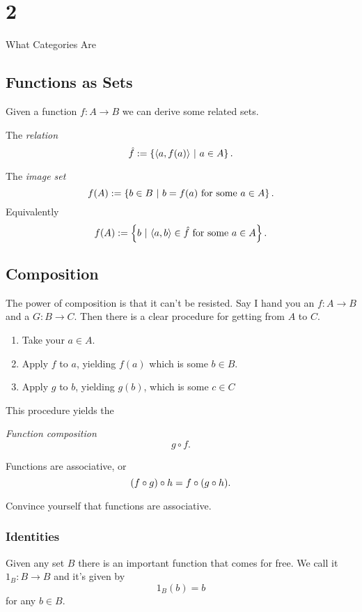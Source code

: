 \documentclass[12pt]{article}
\begin{document}
\chapter{2}{What Categories Are}

\section{Functions as Sets}
    Given a function $f: A \to B$ we can derive some related sets.
    \begin{defi}
        The \emph{relation}
        $$\hat{f} := \left\{ \langle a, f(a) \rangle \ | \  a \in A\right\}.$$ 
    \end{defi}
    \begin{defi}
        The \emph{image set} 
        $$f(A) := \left\{b \in B \ | \   b = f(a) \text{ for some } a \in A\right\}.$$ 
        Equivalently
        $$f(A) := \left\{b \ | \  \langle a, b \rangle \in \hat{f} \text { for some } a \in A\right\}.$$
    \end{defi}

\section{Composition}

    The power of composition is that it can't be resisted.
    Say I hand you an $f : A \to B$ and a $G : B \to C$. 
    Then there is a clear procedure for getting from $A$ to $C$.
    \begin{enumerate}[(1)]
        \item Take your $a \in A$.
        \item Apply $f$ to $a$, yielding $f(a)$ which is some $b \in B$.
        \item Apply $g$ to $b$, yielding $g(b)$, which is some $c \in C$
    \end{enumerate}
    This procedure yields the
    \begin{defi}
        \emph{Function composition}
        $$g\circ f.$$
    \end{defi}

    \begin{fact}
        Functions are associative, or
        $$(f \circ g) \circ h = f \circ (g \circ h).$$
    \end{fact}
    \begin{exercise}
        Convince yourself that functions are associative.
    \end{exercise}

    \subsection{Identities}
    Given any set $B$ there is an important function that comes for free. We call it $1_B : B \to B$ and it's given by
    $$1_B(b) = b$$
    for any $b \in B$.
\end{document}
